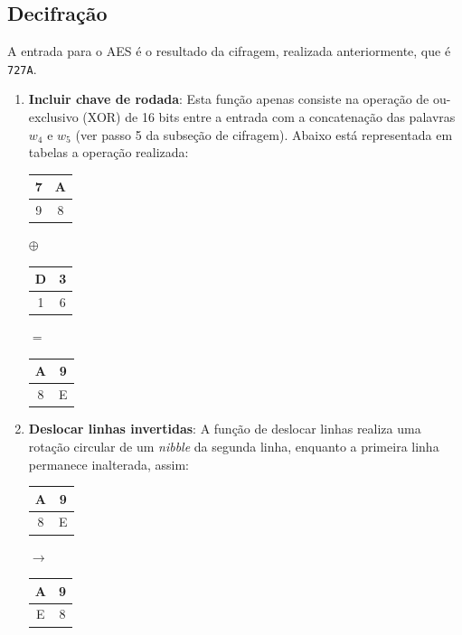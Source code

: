 \documentclass{article}
\begin{document}
\subsection{Decifração}
A entrada para o AES é o resultado da cifragem, realizada anteriormente, que é
\texttt{727A}.
\begin{enumerate}
    \item \textbf{Incluir chave de rodada}: Esta função apenas consiste na
    operação de ou-exclusivo (XOR) de 16 bits entre a entrada com a
    concatenação das palavras $w_{4}$ e $w_{5}$ (ver passo 5 da subseção de
    cifragem). Abaixo está representada em tabelas a operação realizada:
    \begin{center}
        \begin{tabular}{|c|c|}
            \hline
            7 & A  \\
            \hline
            9 & 8 \\
            \hline
        \end{tabular}
        $\oplus$
        \begin{tabular}{|c|c|}
            \hline
            D & 3  \\
            \hline
            1 & 6 \\
            \hline
        \end{tabular}
        $=$
        \begin{tabular}{|c|c|}
            \hline
            A & 9  \\
            \hline
            8 & E \\
            \hline
        \end{tabular}
    \end{center}
    
    \item \textbf{Deslocar linhas invertidas}: A função de deslocar linhas
    realiza uma rotação circular de um \textit{nibble} da segunda linha,
    enquanto a primeira linha permanece inalterada, assim:
    \begin{center}
        \begin{tabular}{|c|c|}
            \hline
            A & 9  \\
            \hline
            8 & E \\
            \hline
        \end{tabular}
        $\to$
        \begin{tabular}{|c|c|}
            \hline
            A & 9  \\
            \hline
            E & 8 \\
            \hline
        \end{tabular}
    \end{center}
    

\end{enumerate}
\end{document}
